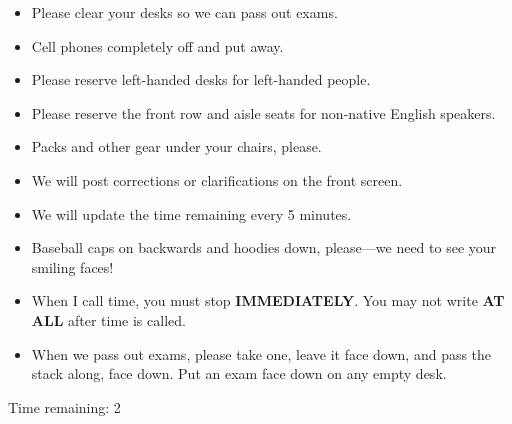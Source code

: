 \begin{frame}
    \begin{itemize}
        \item Please clear your desks so we can pass out exams.
        \item Cell phones completely off and put away.
        \item Please reserve left-handed desks for left-handed people.
        \item Please reserve the front row and aisle seats for
            non-native English speakers.
        \item Packs and other gear under your chairs, please.
        \item We will post corrections or clarifications on the front screen.
        \item We will update the time remaining every 5 minutes.
        \item Baseball caps on backwards and hoodies down, please---we need to
            see your smiling faces!
        \item When I call time, you must stop \textbf{IMMEDIATELY}. You may not
            write \textbf{AT ALL} after time is called.
        \item When we pass out exams, please take one, leave it face down, and
            pass the stack along, face down. Put an exam face down on any empty
            desk.
    \end{itemize}
\end{frame}

\begin{frame}[t]
    \begin{center}
        \vspace{0.5cm}
        {\Huge Time remaining: 2}
    \end{center}

\end{frame}




